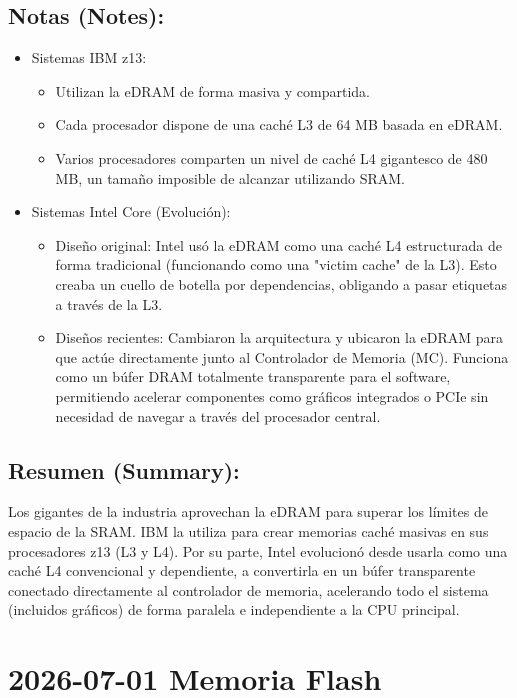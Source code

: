 \documentclass{article}
\begin{document}
\subsection{Notas (Notes):}
\label{sec:orgd3924dc}
\begin{itemize}
\item Sistemas IBM z13: 
\begin{itemize}
\item Utilizan la eDRAM de forma masiva y compartida.
\item Cada procesador dispone de una caché L3 de 64 MB basada en eDRAM.
\item Varios procesadores comparten un nivel de caché L4 gigantesco 
de 480 MB, un tamaño imposible de alcanzar utilizando SRAM.
\end{itemize}
\item Sistemas Intel Core (Evolución):
\begin{itemize}
\item Diseño original: Intel usó la eDRAM como una caché L4 estructurada 
de forma tradicional (funcionando como una "victim cache" de la L3). 
Esto creaba un cuello de botella por dependencias, obligando a 
pasar etiquetas a través de la L3.
\item Diseños recientes: Cambiaron la arquitectura y ubicaron la eDRAM
para que actúe directamente junto al Controlador de Memoria (MC). 
Funciona como un búfer DRAM totalmente transparente para el software, 
permitiendo acelerar componentes como gráficos integrados o PCIe sin 
necesidad de navegar a través del procesador central.
\end{itemize}
\end{itemize}

\subsection{Resumen (Summary):}
\label{sec:orgea18e23}
Los gigantes de la industria aprovechan la eDRAM para superar los 
límites de espacio de la SRAM. IBM la utiliza para crear memorias caché
masivas en sus procesadores z13 (L3 y L4). Por su parte, Intel 
evolucionó desde usarla como una caché L4 convencional y dependiente, 
a convertirla en un búfer transparente conectado directamente al 
controlador de memoria, acelerando todo el sistema (incluidos gráficos) 
de forma paralela e independiente a la CPU principal.

\section{2026-07-01 Memoria Flash}
\label{sec:org75040f7}
\end{document}
